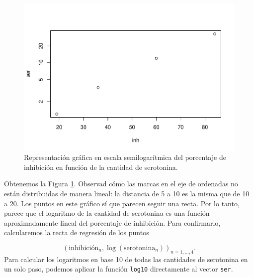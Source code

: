 \documentclass[
]{book}
\newenvironment{Shaded}{\begin{snugshade}}{\end{snugshade}}
\newcommand{\CommentTok}[1]{\textcolor[rgb]{0.56,0.35,0.01}{\textit{#1}}}
\newcommand{\KeywordTok}[1]{\textcolor[rgb]{0.13,0.29,0.53}{\textbf{#1}}}
\newcommand{\NormalTok}[1]{#1}
\newcommand{\OperatorTok}[1]{\textcolor[rgb]{0.81,0.36,0.00}{\textbf{#1}}}
\theoremstyle{definition}
\theoremstyle{definition}
\theoremstyle{definition}
\theoremstyle{remark}
\begin{document}
\begin{figure}

{\centering \includegraphics[width=0.9\linewidth]{03chap02_Un_aperitivo_files/figure-latex/F305bis-1} 

}

\caption{Representación gráfica en escala semilogarítmica del porcentaje de inhibición en función de la cantidad de serotonina.}\label{fig:F305bis}
\end{figure}

Obtenemos la Figura \ref{fig:F305bis}. Observad cómo las marcas en el eje de ordenadas no están distribuidas de manera lineal: la distancia de 5 a 10 es la misma que de 10 a 20. Los puntos en este gráfico sí que parecen seguir una recta. Por lo tanto, parece que el logaritmo de la cantidad de serotonina es una función aproximadamente lineal del porcentaje de inhibición.
Para confirmarlo, calcularemos la recta de regresión de los puntos

\[
(\textrm{inhibición}_n,\log(\textrm{serotonina}_n))_{n=1,\ldots,4}.
\]
Para calcular los logaritmos en base 10 de todas las cantidades de serotonina en un solo paso, podemos aplicar la función \texttt{log10} directamente al vector \texttt{ser}.

\begin{Shaded}
\end{Shaded}
\end{document}
